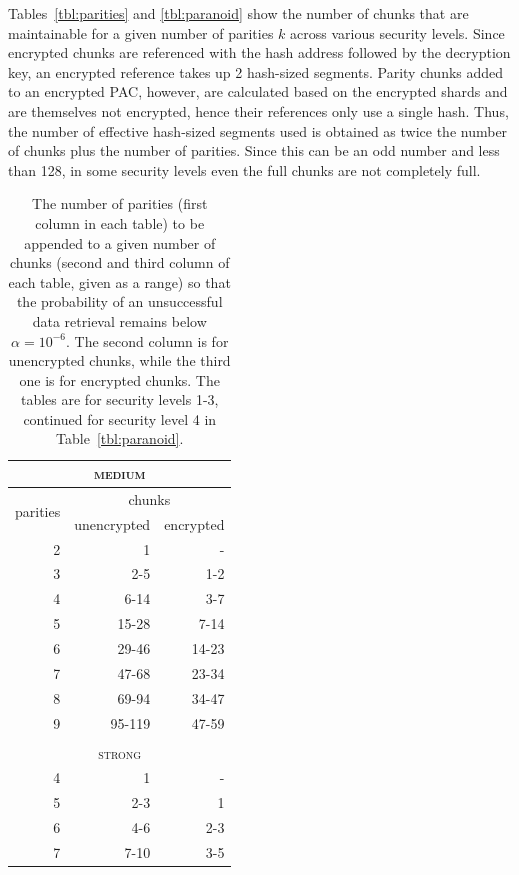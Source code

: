 \documentclass[manuscript,screen,review]{acmart}
\begin{document}
Tables~\ref{tbl:parities} and \ref{tbl:paranoid} show 
the number of chunks that are maintainable for a given number of parities $k$ across various security levels.
Since encrypted chunks are referenced with the hash address followed by the decryption key, an encrypted reference takes up 2 hash-sized segments. Parity chunks added to an encrypted PAC, however, are calculated based on the encrypted shards and are themselves not encrypted, hence their references only use a single hash. 
Thus, the number of effective hash-sized segments 
used is obtained as twice the number of chunks plus the number of parities. Since this can be an odd number and less than 128, in some security levels even the full chunks are not completely full.
%
\begin{table}[!ht]
\centering
\Description[]{}\caption{The number of parities (first column in each table) to be appended to a given number of chunks (second and third column of each table, given as a range) so that the probability of an unsuccessful data retrieval remains below $\alpha = 10^{-6}$. The second column is for unencrypted  chunks, while the third one is for encrypted chunks. The tables are for security levels 1-3, continued for security level 4 in Table~\ref{tbl:paranoid}.}
\begin{minipage}{.49\linewidth}
\begin{tabular}{|r|r|r|}
\multicolumn{3}{c}{\textsc{medium}}\\\hline
\multirow{2}{1.5cm}{\centering 
 parities } 
&\multicolumn{2}{|c|}{ chunks }\\\cline{2-3}
&\multicolumn{1}{|c|}{unencrypted}
&\multicolumn{1}{|c|}{encrypted} \\\hline\hline
2 & 1 & - \\
3 & 2-5     & 1-2\\
4 & 6-14    & 3-7\\ 
5 & 15-28   & 7-14\\ 
6 & 29-46   & 14-23\\  
7 & 47-68   & 23-34\\  
8 & 69-94   & 34-47\\  
9 & 95-119  & 47-59\\   
\hline
%
\multicolumn{3}{c}{\textsc{}}\\
\multicolumn{3}{c}{\textsc{strong}}
\\\hline
4 & 1   &  -\\
5 & 2-3   & 1\\
6 & 4-6   & 2-3\\
7 & 7-10  & 3-5\\

\end{tabular}
\end{minipage}
\end{table}
\end{document}
